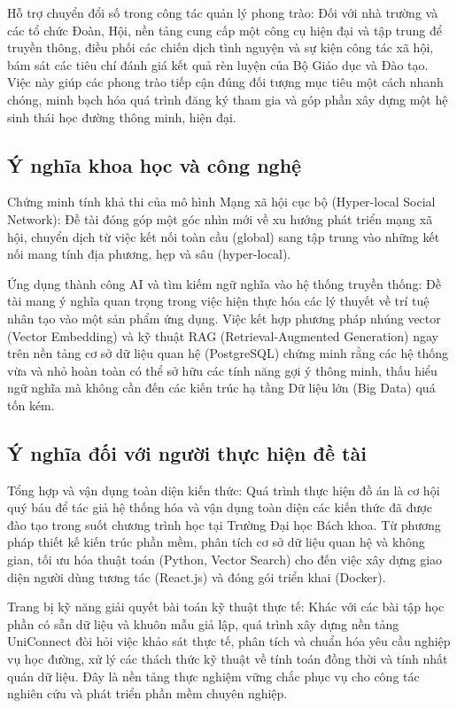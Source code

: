 Hỗ trợ chuyển đổi số trong công tác quản lý phong trào: Đối với nhà trường và các tổ chức Đoàn, Hội, nền tảng cung cấp một công cụ hiện đại và tập trung để truyền thông, điều phối các chiến dịch tình nguyện và sự kiện công tác xã hội, bám sát các tiêu chí đánh giá kết quả rèn luyện của Bộ Giáo dục và Đào tạo\cite{thongtu16bgd}. Việc này giúp các phong trào tiếp cận đúng đối tượng mục tiêu một cách nhanh chóng, minh bạch hóa quá trình đăng ký tham gia và góp phần xây dựng một hệ sinh thái học đường thông minh, hiện đại.

\subsection{Ý nghĩa khoa học và công nghệ}

Chứng minh tính khả thi của mô hình Mạng xã hội cục bộ (Hyper-local Social Network): Đề tài đóng góp một góc nhìn mới về xu hướng phát triển mạng xã hội, chuyển dịch từ việc kết nối toàn cầu (global) sang tập trung vào những kết nối mang tính địa phương, hẹp và sâu (hyper-local)\cite{kwon2014what}.

Ứng dụng thành công AI và tìm kiếm ngữ nghĩa vào hệ thống truyền thống: Đề tài mang ý nghĩa quan trọng trong việc hiện thực hóa các lý thuyết về trí tuệ nhân tạo vào một sản phẩm ứng dụng. Việc kết hợp phương pháp nhúng vector (Vector Embedding) và kỹ thuật RAG (Retrieval-Augmented Generation) ngay trên nền tảng cơ sở dữ liệu quan hệ (PostgreSQL) chứng minh rằng các hệ thống vừa và nhỏ hoàn toàn có thể sở hữu các tính năng gợi ý thông minh, thấu hiểu ngữ nghĩa mà không cần đến các kiến trúc hạ tầng Dữ liệu lớn (Big Data) quá tốn kém\cite{pagliaro2021rag}.

\subsection{Ý nghĩa đối với người thực hiện đề tài}

Tổng hợp và vận dụng toàn diện kiến thức: Quá trình thực hiện đồ án là cơ hội quý báu để tác giả hệ thống hóa và vận dụng toàn diện các kiến thức đã được đào tạo trong suốt chương trình học tại Trường Đại học Bách khoa. Từ phương pháp thiết kế kiến trúc phần mềm, phân tích cơ sở dữ liệu quan hệ và không gian, tối ưu hóa thuật toán (Python, Vector Search) cho đến việc xây dựng giao diện người dùng tương tác (React.js) và đóng gói triển khai (Docker).

Trang bị kỹ năng giải quyết bài toán kỹ thuật thực tế: Khác với các bài tập học phần có sẵn dữ liệu và khuôn mẫu giả lập, quá trình xây dựng nền tảng UniConnect đòi hỏi việc khảo sát thực tế, phân tích và chuẩn hóa yêu cầu nghiệp vụ học đường, xử lý các thách thức kỹ thuật về tính toán đồng thời và tính nhất quán dữ liệu. Đây là nền tảng thực nghiệm vững chắc phục vụ cho công tác nghiên cứu và phát triển phần mềm chuyên nghiệp.

